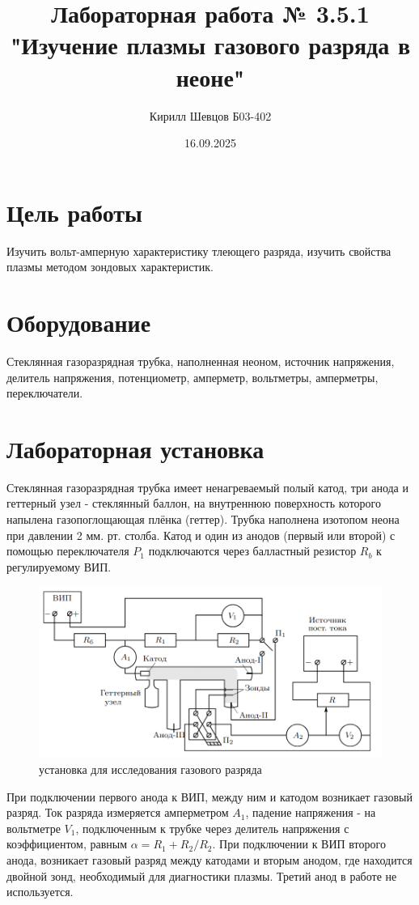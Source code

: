 \documentclass[a4paper, 12pt]{article}
\title{Лабораторная работа № 3.5.1 "Изучение плазмы газового разряда в неоне"}
\author{Кирилл Шевцов Б03-402}
\date{16.09.2025}
\begin{document}
\maketitle
\section*{Цель работы}
Изучить вольт-амперную характеристику тлеющего разряда, изучить свойства плазмы методом зондовых
характеристик.
\section*{Оборудование}
Стеклянная газоразрядная трубка, наполненная неоном, источник напряжения, делитель напряжения, потенциометр,
амперметр, вольтметры, амперметры, переключатели.
\section*{Лабораторная установка}
Стеклянная газоразрядная трубка имеет ненагреваемый полый катод, три анода и геттерный узел - стеклянный баллон,
на внутреннюю поверхность которого напылена газопоглощающая плёнка (геттер). Трубка наполнена изотопом неона при давлении
2 мм. рт. столба. Катод и один из анодов (первый или второй) с помощью переключателя $P_{1}$ подключаются через балластный резистор
$R_{b}$ к регулируемому ВИП.
\begin{figure}[htbp]
    \centering
    \includegraphics[width=0.6\linewidth]{p1.png}
    \caption{установка для исследования газового разряда}
    \label{установка для исследования газового разряда}
\end{figure}
При подключении первого анода к ВИП, между ним и катодом возникает газовый разряд. Ток разряда измеряется
амперметром $A_{1}$, падение напряжения - на вольтметре $V_{1}$, подключенным к трубке через делитель напряжения с
коэффициентом, равным $\alpha = {R_{1} + R_{2}}/R_{2}$. При подключении к ВИП второго анода, возникает газовый разряд между
катодами и вторым анодом, где находится двойной зонд, необходимый для диагностики плазмы. Третий анод в работе не используется.
\end{document}
